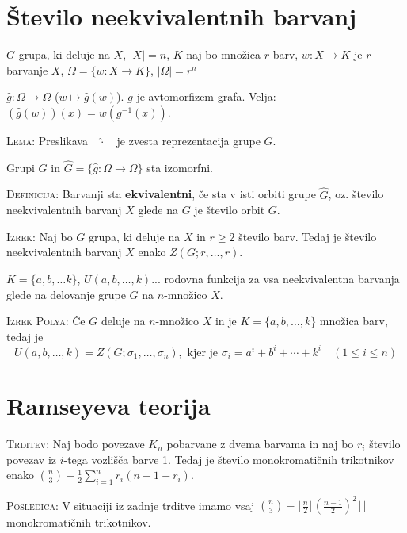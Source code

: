 \documentclass[8pt,a4paper]{amsart}
\theoremstyle{definition} %
\theoremstyle{plain} %
\begin{document}
\section{Število neekvivalentnih barvanj}

$G$ grupa, ki deluje na $X$, $|X|=n$, $K$ naj bo množica $r$-barv, $w: X
\longrightarrow K$ je $r$-barvanje $X$, $\Omega = \{ w: X \longrightarrow K \}$,
$|\Omega| = r^n$

$\widehat{g}: \Omega \longrightarrow \Omega$ ($w \mapsto \widehat{g}(w)$). $g$
je avtomorfizem grafa. Velja: $(\widehat{g}(w))(x) = w(g^{-1}(x))$.

\textsc{Lema:} Preslikava~~$\widehat{\cdot}$~~je zvesta reprezentacija grupe
$G$.

Grupi $G$ in $\widehat{G} = \{ \widehat{g}: \Omega \longrightarrow \Omega \}$
sta izomorfni.

\textsc{Definicija:} Barvanji sta \textbf{ekvivalentni}, če sta v isti orbiti
grupe $\widehat{G}$, oz. število neekvivalentnih barvanj $X$ glede na $G$ je
število orbit $G$.

\hfill

\textsc{Izrek:} Naj bo $G$ grupa, ki deluje na $X$ in $r\geq 2$ število barv. Tedaj je
število neekvivalentnih barvanj $X$ enako $Z(G;r,\ldots ,r)$.

\hfill

$K = \{ a,b,\ldots k\}$, $U(a,b,\ldots, k)$... rodovna funkcija za vsa
neekvivalentna barvanja glede na delovanje grupe $G$ na $n$-množico $X$.

\textsc{Izrek Polya:} Če $G$ deluje na $n$-množico $X$ in je $K = \{ a,b,\ldots
,k\}$ množica barv, tedaj je $$ U(a,b,\ldots, k) = Z(G;\sigma_1,\ldots
,\sigma_n),\text{ kjer je } \sigma_i = a^i + b^i + \cdots + k^i \quad (1\leq i
\leq n) $$

\section{Ramseyeva teorija}

\textsc{Trditev:} Naj bodo povezave $K_n$ pobarvane z dvema barvama in naj bo
$r_i$ število povezav iz $i$-tega vozlišča barve 1. Tedaj je število
monokromatičnih trikotnikov enako $\binom{n}{3} - \frac{1}{2}\sum_{i=1}^n
r_i(n-1-r_i)$.

\textsc{Posledica:} V situaciji iz zadnje trditve imamo vsaj $\binom{n}{3} -
\lfloor \frac{n}{2} \lfloor (\frac{n-1}{2})^2 \rfloor \rfloor $ monokromatičnih
trikotnikov.
\end{document}
